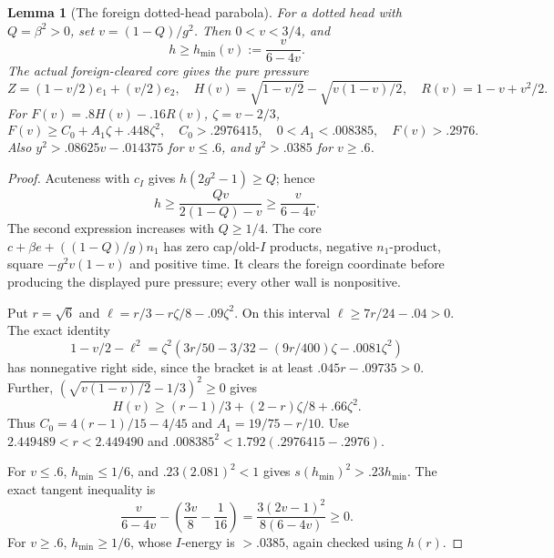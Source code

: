 \documentclass[11pt]{article}
\newtheorem{lemma}[theorem]{Lemma}
\theoremstyle{definition}
\theoremstyle{remark}
\begin{document}
\begin{lemma}[The foreign dotted-head parabola]
\label{lem:I-foreign-head-parabola}
For a dotted head with \(Q=\beta^2>0\), set \(v=(1-Q)/g^2\).
Then \(0<v<3/4\), and
\[
 h\ge h_{\min}(v):={\frac{v}{6-4v}}.
\]
The actual foreign-cleared core gives the pure pressure
\[
 Z=(1-v/2)e_1+(v/2)e_2,\quad
 H(v)=\sqrt{1-v/2}-\sqrt{v(1-v)/2},\quad
 R(v)=1-v+v^2/2.
\]
For \(F(v)=.8H(v)-.16R(v)\), \(\zeta=v-2/3\),
\[
 F(v)\ge C_0+A_1\zeta+.448\zeta^2,\quad
 C_0>.2976415,\quad0<A_1<.008385,\quad F(v)>.2976.
\]
Also \(y^2>.08625v-.014375\) for \(v\le.6\), and
\(y^2>.0385\) for \(v\ge.6\).
\end{lemma}
\begin{proof}
Acuteness with \(c_I\) gives \(h(2g^2-1)\ge Q\); hence
\[
 h\ge{\frac{Qv}{2(1-Q)-v}}\ge{\frac{v}{6-4v}}.
\]
The second expression increases with \(Q\ge1/4\).
The core \(c+\beta e+((1-Q)/g)n_1\) has zero cap/old-\(I\)
products, negative \(n_1\)-product, square \(-g^2v(1-v)\)
and positive time. It clears the foreign coordinate before producing
the displayed pure pressure; every other wall is nonpositive.

Put \(r=\sqrt6\) and \(\ell=r/3-r\zeta/8-.09\zeta^2\).
On this interval \(\ell\ge7r/24-.04>0\).
The exact identity
\[
 1-v/2-\ell^2
 =\zeta^2(3r/50-3/32-(9r/400)\zeta-.0081\zeta^2)
\]
has nonnegative right side, since the bracket is at least
\(.045r-.09735>0\). Further,
\((\sqrt{v(1-v)/2}-1/3)^2\ge0\) gives
\[
 H(v)\ge(r-1)/3+(2-r)\zeta/8+.66\zeta^2.
\]
Thus \(C_0=4(r-1)/15-4/45\) and
\(A_1=19/75-r/10\). Use
\(2.449489<r<2.449490\) and
\(.008385^2<1.792(.2976415-.2976)\).

For \(v\le.6\), \(h_{\min}\le1/6\), and
\(.23(2.081)^2<1\) gives \(s(h_{\min})^2>.23h_{\min}\).
The exact tangent inequality is
\[
 {\frac{v}{6-4v}}-\left({\frac{3v}{8}}-{\frac{1}{16}}\right)
 ={\frac{3(2v-1)^2}{8(6-4v)}}\ge0.
\]
For \(v\ge.6\), \(h_{\min}\ge1/6\), whose \(I\)-energy is
\(>.0385\), again checked using \(h(r)\).
\end{proof}
\end{document}

